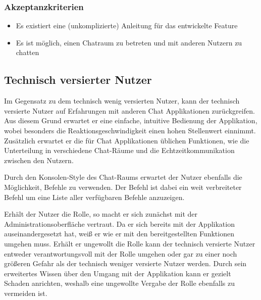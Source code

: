 \subsubsection{Akzeptanzkriterien}
\begin{itemize}
  \item Es existiert eine (unkomplizierte) Anleitung für das entwickelte Feature
  \item Es ist möglich, einen Chatraum zu betreten und mit anderen Nutzern zu chatten
\end{itemize}

\subsection{Technisch versierter Nutzer}
Im Gegensatz zu dem technisch wenig versierten Nutzer, kann der technisch versierte Nutzer auf Erfahrungen mit anderen Chat Applikationen zurückgreifen.
Aus diesem Grund erwartet er eine einfache, intuitive Bedienung der Applikation, wobei besonders die Reaktionsgeschwindigkeit einen hohen Stellenwert einnimmt.
Zusätzlich erwartet er die für Chat Applikationen üblichen Funktionen, wie die Unterteilung in verschiedene Chat-Räume und die Echtzeitkommunikation zwischen den Nutzern.

\noindent{}Durch den Konsolen-Style des Chat-Raums erwartet der Nutzer ebenfalls die Möglichkeit, Befehle zu verwenden.
Der Befehl  ist dabei ein weit verbreiteter Befehl um eine Liste aller verfügbaren Befehle anzuzeigen.

\noindent{}Erhält der Nutzer die  Rolle, so macht er sich zunächst mit der Administrationsoberfläche vertraut.
Da er sich bereits mit der Applikation auseinandergesetzt hat, weiß er wie er mit den bereitgestellten Funktionen umgehen muss.
Erhält er ungewollt die Rolle  kann der technisch versierte Nutzer entweder verantwortungsvoll mit der Rolle umgehen oder gar zu einer noch größeren Gefahr als der technisch weniger versierte Nutzer werden.
Durch sein erweitertes Wissen über den Umgang mit der Applikation kann er gezielt Schaden anrichten, weshalb eine ungewollte Vergabe der Rolle ebenfalls zu vermeiden ist.

